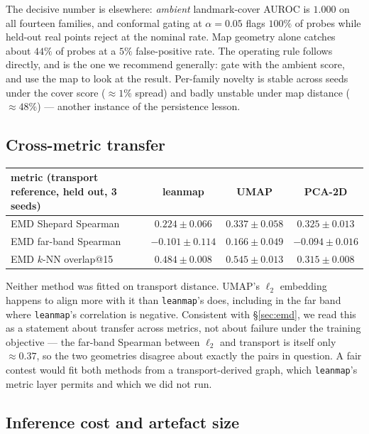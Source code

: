 \documentclass[12pt]{iopart}
\theoremstyle{definition}
\theoremstyle{plain}
\theoremstyle{remark}
\newcommand{\code}[1]{\texttt{#1}}
\begin{document}
The decisive number is elsewhere: \emph{ambient} landmark-cover AUROC is
$1.000$ on all fourteen families, and conformal gating at $\alpha=0.05$ flags
$100\%$ of probes while held-out real points reject at the nominal rate. Map
geometry alone catches about $44\%$ of probes at a $5\%$ false-positive rate.
The operating rule follows directly, and is the one we recommend generally: gate
with the ambient score, and use the map to look at the result. Per-family
novelty is stable across seeds under the cover score ($\approx1\%$ spread) and
badly unstable under map distance ($\approx48\%$) --- another instance of the
persistence lesson.

\subsection{Cross-metric transfer}
\label{sec:emdresults}

\begin{center}
\small
\begin{tabular}{lccc}
\toprule
metric (transport reference, held out, 3 seeds) & leanmap & UMAP & PCA-2D \\
\midrule
EMD Shepard Spearman & $0.224\pm0.066$ & $0.337\pm0.058$ & $0.325\pm0.013$ \\
EMD far-band Spearman & $-0.101\pm0.114$ & $0.166\pm0.049$ & $-0.094\pm0.016$ \\
EMD $k$-NN overlap@15 & $0.484\pm0.008$ & $0.545\pm0.013$ & $0.315\pm0.008$ \\
\bottomrule
\end{tabular}
\end{center}

Neither method was fitted on transport distance. UMAP's $\ell_2$ embedding
happens to align more with it than \code{leanmap}'s does, including in the far
band where \code{leanmap}'s correlation is negative. Consistent with
\S\ref{sec:emd}, we read this as a statement about transfer across metrics, not
about failure under the training objective --- the far-band Spearman between
$\ell_2$ and transport is itself only $\approx0.37$, so the two geometries
disagree about exactly the pairs in question. A fair contest would fit both
methods from a transport-derived graph, which \code{leanmap}'s metric layer
permits and which we did not run.

\subsection{Inference cost and artefact size}
\label{sec:inference}
\end{document}
